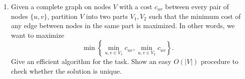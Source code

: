 \documentclass[11pt,letterpaper]{article}
\newtheorem{lemma}[theorem]{Lemma}
\theoremstyle{definition}
\newcommand{\calC}{\mathcal{C}}
\newcommand{\ALG}{\mathrm{ALG}}
\begin{document}




\begin{enumerate}[resume=q]
\item[10.**] Given a complete graph on nodes $V$ with a cost $c_{uv}$ between every pair of nodes $\{u,v\}$, partition $V$ into two parts $V_1, V_2$ such that the minimum cost of any edge between nodes in the same part is maximized. In other words, we want to maximize
\[
\min\left\{ \min_{u,v \in V_1} c_{uv}, \min_{u,v \in V_2} c_{uv} \right\}.
\]
Give an efficient algorithm for the task. Show an easy $O(|V|)$ procedure to check whether the solution is unique.
\end{enumerate}
\end{document}
